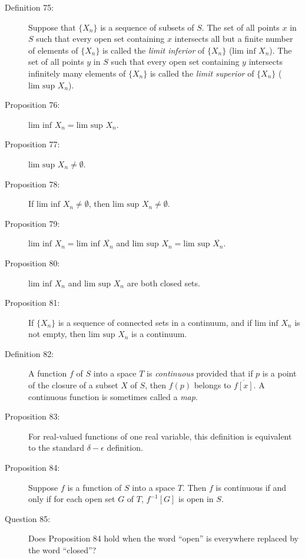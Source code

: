 \documentclass{article}
\begin{document}
\begin{description}
  \item[Definition 75:] Suppose that $\{ X_n \}$ is a sequence of subsets of $S$. The set of all points $x$ in $S$ such that every open set containing $x$ intersects all but a finite number of elements of $\{ X_n \}$ is called the \emph{limit inferior} of $\{ X_n \}$ ($\text{lim inf } X_n$). The set of all points $y$ in $S$ such that every open set containing $y$ intersects infinitely many elements of $\{ X_n \}$ is called the \emph{limit superior} of $\{ X_n \}$ ($\text{lim sup } X_n$).

  \item[Proposition 76:] $\text{lim inf } X_n = \text{lim sup } X_n$.

  \item[Proposition 77:] $\text{lim sup } X_n \neq \emptyset$.

  \item[Proposition 78:] If $\text{lim inf } X_n \neq \emptyset$, then $\text{lim sup } X_n \neq \emptyset$.

  \item[Proposition 79:] $\text{lim inf } X_n = \text{lim inf } \overline{X_n}$ and $\text{lim sup } X_n = \text{lim sup } \overline{X_n}$.

  \item[Proposition 80:] $\text{lim inf } X_n$ and $\text{lim sup } X_n$ are both closed sets.

  \item[Proposition 81:] If $\{ X_n \}$ is a sequence of connected sets in a continuum, and if $\text{lim inf } X_n$ is not empty, then $\text{lim sup } X_n$ is a continuum.

  \item[Definition 82:] A function $f$ of $S$ into a space $T$ is \emph{continuous} provided that if $p$ is a point of the closure of a subset $X$ of $S$, then $f(p)$ belongs to $\overline{f[x]}$. A continuous function is sometimes called a \emph{map}.

  \item[Proposition 83:] For real-valued functions of one real variable, this definition is equivalent to the standard $\delta - \epsilon$ definition.

  \item[Proposition 84:] Suppose $f$ is a function of $S$ into a space $T$. Then $f$ is continuous if and only if for each open set $G$ of $T$, $f^{-1}[G]$ is open in $S$.

  \item[Question 85:] Does Proposition 84 hold when the word ``open'' is everywhere replaced by the word ``closed''?


\end{description}
\end{document}
